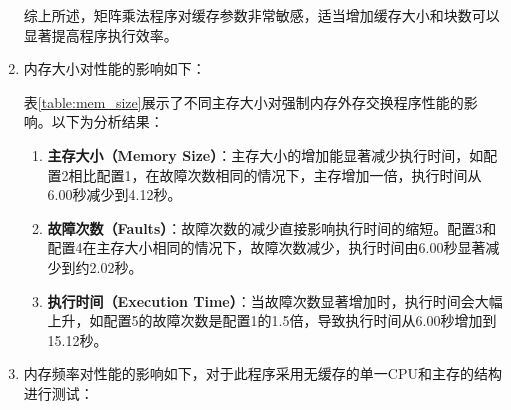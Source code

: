 \documentclass{article}
\begin{document}
\begin{enumerate}
综上所述，矩阵乘法程序对缓存参数非常敏感，适当增加缓存大小和块数可以显著提高程序执行效率。
  \item 内存大小对性能的影响如下：
  \begin{table}[h!]
    \centering
    \caption{内存大小测试}
    \label{table:mem_size}
    \end{table}

    表\ref{table:mem_size}展示了不同主存大小对强制内存外存交换程序性能的影响。以下为分析结果：

\begin{enumerate}
    \item \textbf{主存大小（Memory Size）}：主存大小的增加能显著减少执行时间，如配置2相比配置1，在故障次数相同的情况下，主存增加一倍，执行时间从6.00秒减少到4.12秒。
    \item \textbf{故障次数（Faults）}：故障次数的减少直接影响执行时间的缩短。配置3和配置4在主存大小相同的情况下，故障次数减少，执行时间由6.00秒显著减少到约2.02秒。
    \item \textbf{执行时间（Execution Time）}：当故障次数显著增加时，执行时间会大幅上升，如配置5的故障次数是配置1的1.5倍，导致执行时间从6.00秒增加到15.12秒。
\end{enumerate}
  \item 内存频率对性能的影响如下，对于此程序采用无缓存的单一CPU和主存的结构进行测试：
  \begin{table}[h!]
    \centering
    \small
    \caption{内存频率测试}
    \label{table:mem_fre}
    \end{table}


\end{enumerate}
\end{document}

